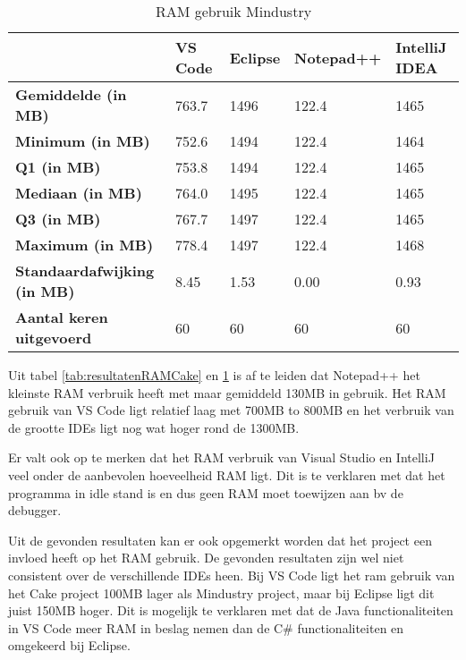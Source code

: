 \begin{table}[h]
	\centering
	\begin{tabular}{ l l l l l }
		\hline
		                                    & \textbf{VS Code} & \textbf{Eclipse} & \textbf{Notepad++} & \textbf{IntelliJ IDEA} \\
		\hline
		\textbf{Gemiddelde (in MB)}         & 763.7            & 1496             & 122.4              & 1465                   \\[1ex]

		\textbf{Minimum (in MB) }           & 752.6            & 1494             & 122.4              & 1464                   \\
		\textbf{Q1 (in MB)}                 & 753.8            & 1494             & 122.4              & 1465                   \\
		\textbf{Mediaan (in MB)}            & 764.0            & 1495             & 122.4              & 1465                   \\
		\textbf{Q3 (in MB)}                 & 767.7            & 1497             & 122.4              & 1465                   \\
		\textbf{Maximum (in MB)}            & 778.4            & 1497             & 122.4              & 1468                   \\[1ex]

		\textbf{Standaardafwijking (in MB)} & 8.45             & 1.53             & 0.00               & 0.93                   \\
		\textbf{Aantal keren uitgevoerd}    & 60               & 60               & 60                 & 60                     \\
		\hline
	\end{tabular}
	\caption{RAM gebruik Mindustry}
	\label{tab:resultatenRAMMindustry}
\end{table}

Uit tabel \ref{tab:resultatenRAMCake} en \ref{tab:resultatenRAMMindustry} is af te leiden dat Notepad++ het kleinste RAM verbruik heeft met maar gemiddeld 130MB in gebruik. Het RAM gebruik van VS Code ligt relatief laag met 700MB to 800MB en het verbruik van de grootte IDEs ligt nog wat hoger rond de 1300MB.

Er valt ook op te merken dat het RAM verbruik van Visual Studio en IntelliJ veel onder de aanbevolen hoeveelheid RAM ligt. Dit is te verklaren met dat het programma in idle stand is en dus geen RAM moet toewijzen aan bv de debugger. 

Uit de gevonden resultaten kan er ook opgemerkt worden dat het project een invloed heeft op het RAM gebruik. De gevonden resultaten zijn wel niet consistent over de verschillende IDEs heen. Bij VS Code ligt het ram gebruik van het Cake project 100MB lager als Mindustry project, maar bij Eclipse ligt dit juist 150MB hoger. Dit is mogelijk te verklaren met dat de Java functionaliteiten in VS Code meer RAM in beslag nemen dan de C\# functionaliteiten en omgekeerd bij Eclipse.
